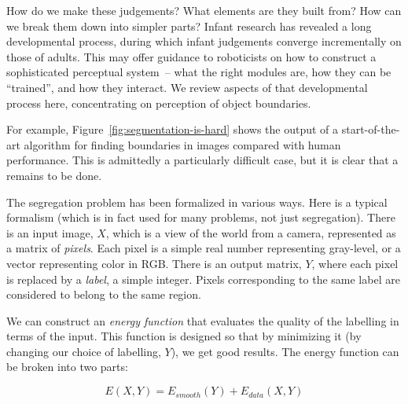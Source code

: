 

%

\ifverbose
%
%
%
How do we make these judgements?  What elements are they built from?
How can we break them down into simpler parts?
%
Infant research has revealed a long developmental process, during
which infant judgements converge incrementally on those of adults.
%
This may offer guidance to roboticists on how to construct a
sophisticated perceptual system~-- what the right modules are, how
they can be ``trained'', and how they interact.  We review aspects 
of that developmental process here, concentrating on perception
of object boundaries.
\fi




\ifverbose
For example, Figure~\ref{fig:segmentation-is-hard} shows the
output of a start-of-the-art algorithm for finding boundaries in images
\cite{martin04learning} compared with human performance.  This is
admittedly a particularly difficult case, but it is clear that 
a remains to
be done.
\fi


\ifverbose

The segregation problem has been formalized in various ways.  Here is
a typical formalism (which is in fact used for many problems, not just
segregation).  There is an input image, $X$, which is a view of the
world from a camera, represented as a matrix of {\em pixels}.  Each
pixel is a simple real number representing gray-level, or a vector
representing color in RGB.
%
There is an output matrix, $Y$, where each pixel is replaced by
a {\em label}, a simple integer.  Pixels corresponding to the 
same label are considered to belong to the same region.

We can construct an {\em energy function} that evaluates the quality
of the labelling in terms of the input.  This function is designed so
that by minimizing it (by changing our choice of labelling, $Y$), we
get good results.  The energy function can be broken into two
parts:

\begin{displaymath}
%
E(X,Y) = E_{smooth}(Y) + E_{data}(X,Y)
%
\end{displaymath}

